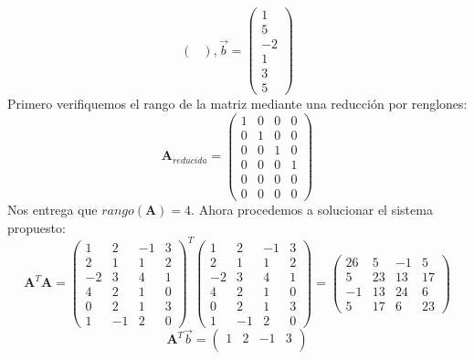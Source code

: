 \documentclass[11pt]{article}
\theoremstyle{definition}
\begin{document}
\begin{enumerate}[(i)]
\begin{equation*}
\begin{pmatrix}
\end{pmatrix}, 
\vec{b} =
\begin{pmatrix}
1\\
5\\
-2\\
1\\
3\\
5
\end{pmatrix}
\end{equation*}
Primero verifiquemos el rango de la matriz mediante una reducci\'on por renglones:
\begin{equation*}
\textbf{A}_{reducida} =
\begin{pmatrix}
1 & 0 & 0 & 0\\
0 & 1 & 0 & 0\\
0 & 0 & 1 & 0\\
0 & 0 & 0 & 1\\
0 & 0 & 0 & 0\\
0 & 0 & 0 & 0
\end{pmatrix}
\end{equation*}
Nos entrega que $rango(\textbf{A}) = 4$. Ahora procedemos a solucionar el sistema propuesto:
\begin{equation*}
\textbf{A}^{T}\textbf{A} =
\begin{pmatrix}
1 & 2 & -1 & 3\\
2 & 1 & 1 & 2\\
-2 & 3 & 4 & 1\\
4 & 2 & 1 & 0\\
0 & 2 & 1 & 3\\
1 & -1 & 2 & 0
\end{pmatrix}^{T}
\begin{pmatrix}
1 & 2 & -1 & 3\\
2 & 1 & 1 & 2\\
-2 & 3 & 4 & 1\\
4 & 2 & 1 & 0\\
0 & 2 & 1 & 3\\
1 & -1 & 2 & 0
\end{pmatrix} =
\begin{pmatrix}
26 & 5 & -1 & 5\\
5 & 23 & 13 & 17\\
-1 & 13 & 24 & 6\\
5 & 17 & 6 & 23
\end{pmatrix}
\end{equation*}
\begin{equation*}
\textbf{A}^{T}\vec{b} =
\begin{pmatrix}
1 & 2 & -1 & 3\\

\end{pmatrix}
\end{equation*}
\end{enumerate}
\end{document}
